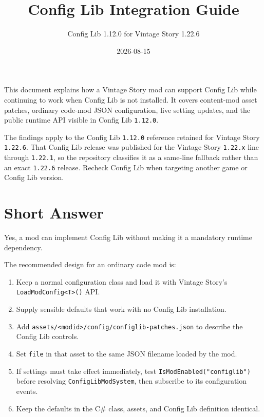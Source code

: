 \documentclass[
  11pt,
  letterpaper,
  titlepage]{article}
\title{Config Lib Integration Guide}
\subtitle{Config Lib 1.12.0 for Vintage Story 1.22.6}
\author{}
\date{2026-08-15}
\providecommand{\tightlist}{%
  \setlength{\itemsep}{0pt}\setlength{\parskip}{0pt}}
\begin{document}
\maketitle

{
\hypersetup{linkcolor=black}
\setcounter{tocdepth}{2}
\tableofcontents
}
This document explains how a Vintage Story mod can support Config Lib
while continuing to work when Config Lib is not installed. It covers
content-mod asset patches, ordinary code-mod JSON configuration, live
setting updates, and the public runtime API visible in Config Lib
\texttt{1.12.0}.

The findings apply to the Config Lib \texttt{1.12.0} reference retained
for Vintage Story \texttt{1.22.6}. That Config Lib release was published
for the Vintage Story \texttt{1.22.x} line through \texttt{1.22.1}, so
the repository classifies it as a same-line fallback rather than an
exact \texttt{1.22.6} release. Recheck Config Lib when targeting another
game or Config Lib version.

\section{Short Answer}\label{short-answer}

Yes, a mod can implement Config Lib without making it a mandatory
runtime dependency.

The recommended design for an ordinary code mod is:

\begin{enumerate}
\def\labelenumi{\arabic{enumi}.}
\tightlist
\item
  Keep a normal configuration class and load it with Vintage Story's
  \texttt{LoadModConfig\textless{}T\textgreater{}()} API.
\item
  Supply sensible defaults that work with no Config Lib installation.
\item
  Add
  \texttt{assets/\textless{}modid\textgreater{}/config/configlib-patches.json}
  to describe the Config Lib controls.
\item
  Set \texttt{file} in that asset to the same JSON filename loaded by
  the mod.
\item
  If settings must take effect immediately, test
  \texttt{IsModEnabled("configlib")} before resolving
  \texttt{ConfigLibModSystem}, then subscribe to its configuration
  events.
\item
  Keep the defaults in the C\# class, assets, and Config Lib definition
  identical.
\end{enumerate}
\end{document}
